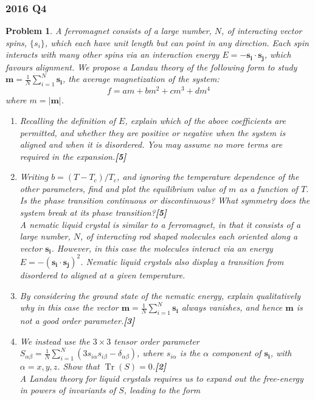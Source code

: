 \documentclass[a4paper]{article}
\DeclareMathOperator{\Tr}{Tr}
\theoremstyle{new}
\newtheorem{qns}{Problem}[section]
\begin{document}
\subsubsection*{2016 Q4}
\begin{qns}
A ferromagnet consists of a large number, $N$, of interacting vector spins, $\{s_i\}$, which each have unit length but can point in any direction. Each spin interacts with many other spins via an interaction energy $E=-\mathbf{s_i}\cdot\mathbf{s_j}$, which favours alignment. We propose a Landau theory of the following form to study $\mathbf{m}=\frac{1}{N}\sum_{i=1}^N\mathbf{s_i}$, the average magnetization of the system:
$$f=am+bm^2+cm^3+dm^4$$
where $m=|\mathbf{m}|$.
\begin{enumerate}[label=(\alph*)]
\item  Recalling the definition of $E$, explain which of the above coefficients are permitted, and whether they are positive or negative when the system is aligned and when it is disordered. You may assume no more terms are required in the expansion.\hfill\textbf{[5]}
\item Writing $b=(T-T_c)/T_c$, and ignoring the temperature dependence of the other parameters, find and plot the equilibrium value of $m$ as a function of $T$. Is the phase transition continuous or discontinuous? What symmetry does the system break at its phase transition?\hfill\textbf{[5]}\\[5pt]
A nematic liquid crystal is similar to a ferromagnet, in that it consists of a large number, $N$, of interacting rod shaped molecules each oriented along a vector $\mathbf{s_i}$. However,
in this case the molecules interact via an energy $E=-(\mathbf{s_i}\cdot\mathbf{s_j})^2$. Nematic liquid crystals also display a transition from disordered to aligned at a given temperature.
\item  By considering the ground state of the nematic energy, explain qualitatively why in this case the vector $\mathbf{m}=\frac{1}{N}\sum_{i=1}^N\mathbf{s_i}$ always vanishes, and hence $\mathbf{m}$ is not a good order parameter.\hfill\textbf{[3]}
\item We instead use the $3\times 3$ tensor order parameter $S_{\alpha\beta}=\frac{1}{N}\sum_{i=1}^N(3s_{i\alpha}s_{i\beta}-\delta_{\alpha\beta})$, where $s_{i\alpha}$ is the $\alpha$ component of $\mathbf{s_i}$, with $\alpha=x,y,z$. Show that $\Tr(S)=0$.\hfill\textbf{[2]}\\[5pt]
A Landau theory for liquid crystals requires us to expand out the free-energy in powers of invariants of $S$, leading to the form

\end{enumerate}
\end{qns}
\end{document}
